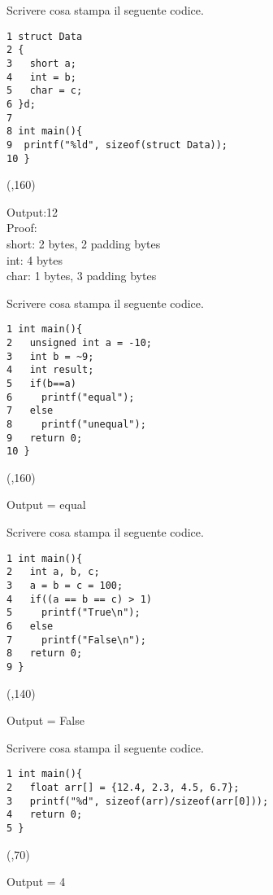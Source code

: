\documentclass[addpoints,12pt]{exam}
\begin{document}
\begin{questions}
    \question[3] Scrivere cosa stampa il seguente codice.
    \setlength{\columnsep}{2cm}
    \begin{multicols}{2}
    \begin{verbatim}
1 struct Data
2 {
3   short a;
4   int = b;
5   char = c;
6 }d;
7
8 int main(){
9  printf("%ld", sizeof(struct Data));
10 }
    \end{verbatim}
    \columnbreak
    \framebox(\linewidth,160){\parbox{6cm}{
    Output:12\\
    \newline
    Proof:\\
    short: 2 bytes, 2 padding bytes\\
    int: 4 bytes\\
    char: 1 bytes, 3 padding bytes
    }}
    \end{multicols}

    \question[2] Scrivere cosa stampa il seguente codice.
    \setlength{\columnsep}{2cm}
    \begin{multicols}{2}
    \begin{verbatim}
1 int main(){
2   unsigned int a = -10;
3   int b = ~9;
4   int result;
5   if(b==a)
6     printf("equal");
7   else
8     printf("unequal");
9   return 0;
10 }
    \end{verbatim}
    \columnbreak
    \framebox(\linewidth,160){\parbox{3cm}{
    Output = equal
    }}
    \end{multicols}

    \question[1] Scrivere cosa stampa il seguente codice.
    \setlength{\columnsep}{2cm}
    \begin{multicols}{2}
    \begin{verbatim}
1 int main(){
2   int a, b, c;
3   a = b = c = 100;
4   if((a == b == c) > 1)
5     printf("True\n");
6   else
7     printf("False\n");
8   return 0;
9 }
    \end{verbatim}
    \columnbreak
    \framebox(\linewidth,140){\parbox{3cm}{
    Output = False
    }}
    \end{multicols}
    
    \newpage
    \thispagestyle{empty}
    \question[1] Scrivere cosa stampa il seguente codice.
    \setlength{\columnsep}{5cm}
    \begin{multicols}{2}
    \begin{verbatim}
1 int main(){
2   float arr[] = {12.4, 2.3, 4.5, 6.7};
3   printf("%d", sizeof(arr)/sizeof(arr[0]));
4   return 0;
5 }
    \end{verbatim}
    \columnbreak
    \framebox(\linewidth,70){\parbox{2.5cm}{
    Output = 4
    }}
    \end{multicols}
    

\end{questions}
\end{document}
